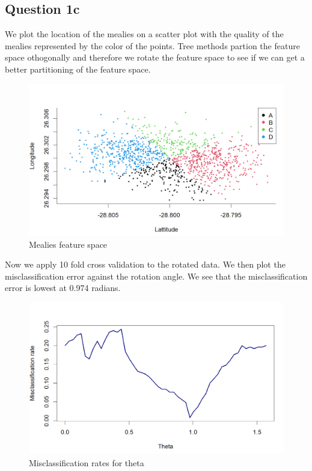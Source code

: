 \documentclass[
]{article}
\begin{document}
\hypertarget{question-1c}{%
\subsection{Question 1c}\label{question-1c}}

We plot the location of the mealies on a scatter plot with the quality
of the mealies represented by the color of the points. Tree methods
partion the feature space othogonally and therefore we rotate the
feature space to see if we can get a better partitioning of the feature
space.

\begin{figure}
\centering
\includegraphics[width=4.84375in,height=\textheight]{feature_space_mealies.png}
\caption{Mealies feature space}
\end{figure}

Now we apply 10 fold cross validation to the rotated data. We then plot
the misclassification error against the rotation angle. We see that the
misclassification error is lowest at 0.974 radians.

\begin{figure}
\centering
\includegraphics[width=4.41667in,height=\textheight]{misclass_theta_mealies.png}
\caption{Misclassification rates for theta}
\end{figure}
\end{document}
